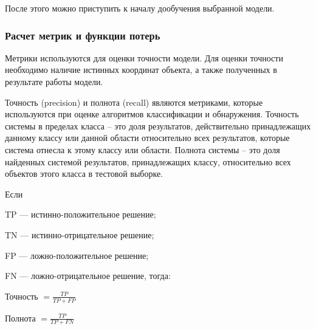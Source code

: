 После этого можно приступить к началу дообучения выбранной модели.

\subsubsection{Расчет метрик и функции потерь}

Метрики используются для оценки точности модели. Для оценки точности необходимо наличие истинных координат объекта, а также полученных в результате работы модели. 

Точность (precision) и полнота (recall) являются метриками, которые используются при оценке алгоритмов классификации и обнаружения. Точность системы в пределах класса – это доля результатов, действительно принадлежащих данному классу или данной области относительно всех результатов, которые система отнесла к этому классу или области. Полнота системы – это доля найденных системой результатов, принадлежащих классу, относительно всех объектов этого класса в тестовой выборке.

Если 

%
\begin{itemize*}
  \item TP — истинно-положительное решение;
  \item TN — истинно-отрицательное решение;
  \item FP — ложно-положительное решение;
  \item FN — ложно-отрицательное решение, тогда:
\end{itemize*}
%
\begin{center}
Точность \(= \frac{TP}{TP+FP}\)
\end{center}

\begin{center}
Полнота \( = \frac{TP}{TP+FN}\)
\end{center}

